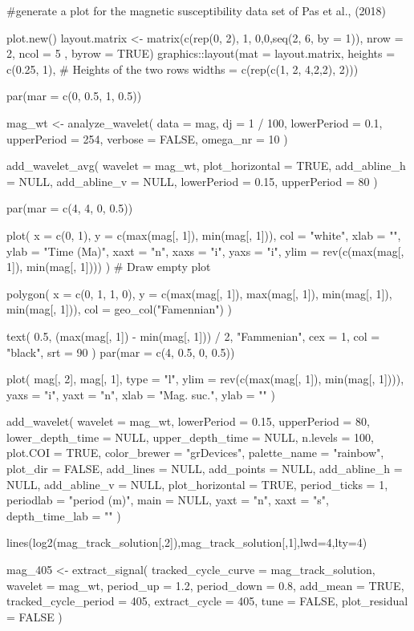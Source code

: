 \documentclass[a4paper]{book}
\begin{document}
\begin{Examples}
\begin{ExampleCode}

#generate a plot for the magnetic susceptibility data set of Pas et al., (2018)

plot.new()
layout.matrix <- matrix(c(rep(0, 2), 1, 0,0,seq(2, 6, by = 1)),
                       nrow = 2,
                      ncol = 5 ,
                       byrow = TRUE)
graphics::layout(mat = layout.matrix,
                heights = c(0.25, 1),
                # Heights of the two rows
                widths = c(rep(c(1, 2, 4,2,2), 2)))

par(mar = c(0, 0.5, 1, 0.5))


mag_wt <-
 analyze_wavelet(
   data = mag,
   dj = 1 / 100,
  lowerPeriod = 0.1,
   upperPeriod = 254,
   verbose = FALSE,
   omega_nr = 10
 )

add_wavelet_avg(
 wavelet = mag_wt,
 plot_horizontal = TRUE,
 add_abline_h = NULL,
 add_abline_v = NULL,
 lowerPeriod = 0.15,
 upperPeriod = 80
)


par(mar = c(4, 4, 0, 0.5))


plot(
 x = c(0, 1),
 y = c(max(mag[, 1]), min(mag[, 1])),
 col = "white",
 xlab = "",
 ylab = "Time (Ma)",
 xaxt = "n",
 xaxs = "i",
 yaxs = "i",
 ylim = rev(c(max(mag[, 1]), min(mag[, 1])))
)            # Draw empty plot


polygon(
 x = c(0, 1, 1, 0),
 y = c(max(mag[, 1]), max(mag[, 1]), min(mag[, 1]), min(mag[, 1])),
 col = geo_col("Famennian")
)

text(
 0.5,
 (max(mag[, 1]) - min(mag[, 1])) / 2,
 "Fammenian",
 cex = 1,
 col = "black",
 srt = 90
)
par(mar = c(4, 0.5, 0, 0.5))


plot(
 mag[, 2],
 mag[, 1],
 type = "l",
 ylim = rev(c(max(mag[, 1]), min(mag[, 1]))),
 yaxs = "i",
 yaxt = "n",
 xlab = "Mag. suc.",
 ylab = ""
)

add_wavelet(
 wavelet = mag_wt,
 lowerPeriod = 0.15,
 upperPeriod = 80,
 lower_depth_time = NULL,
 upper_depth_time = NULL,
 n.levels = 100,
 plot.COI = TRUE,
 color_brewer = "grDevices",
 palette_name = "rainbow",
 plot_dir = FALSE,
 add_lines = NULL,
 add_points = NULL,
 add_abline_h = NULL,
 add_abline_v = NULL,
 plot_horizontal = TRUE,
 period_ticks = 1,
 periodlab = "period (m)",
 main = NULL,
 yaxt = "n",
 xaxt = "s",
 depth_time_lab = ""
)

lines(log2(mag_track_solution[,2]),mag_track_solution[,1],lwd=4,lty=4)

mag_405 <- extract_signal(
 tracked_cycle_curve = mag_track_solution,
 wavelet = mag_wt,
 period_up = 1.2,
 period_down = 0.8,
 add_mean = TRUE,
 tracked_cycle_period = 405,
 extract_cycle = 405,
 tune = FALSE,
 plot_residual = FALSE
)


\end{ExampleCode}
\end{Examples}
\end{document}
